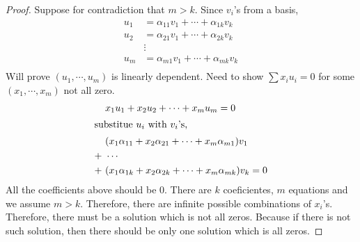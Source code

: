 \begin{proof}
	Suppose for contradiction that $m > k$. Since $v_i$'s from a basis,
	\begin{align*}
		u_1 &= \alpha_{11} v_1 + \cdots + \alpha_{1k}v_k\\
		u_2 &= \alpha_{21} v_1 + \cdots + \alpha_{2k}v_k\\
            &\vdots\\
        u_m &= \alpha_{m1} v_1 + \cdots + \alpha_{mk}v_k\\
	\end{align*}
Will prove $(u_1, \cdots, u_m)$ is linearly dependent. Need to show
$\sum x_i u_i = 0$ for some $(x_1, \cdots, x_m)$ not all zero.
\begin{align*}
	&x_1 u_1 + x_2 u_2 + \cdots + x_m u_m = 0\\
	\intertext{substitue $u_i$ with $v_i$'s,}
	&(x_1 \alpha_{11} + x_2 \alpha_{21} + \cdots + x_m \alpha_{m1}) v_1\\
	+~& \cdots\\
	+~&(x_1 \alpha_{1k} + x_2 \alpha_{2k} + \cdots + x_m \alpha_{mk}) v_k = 0
\end{align*}
All the coefficients above should be 0. There are $k$ coeficientes, $m$ 
equations and we assume $m > k$. Therefore, there are infinite possible 
combinations of $x_i$'s. Therefore, there must be a solution which is not 
all zeros. Because if there is not such solution, then there should be only one 
solution which is all zeros.
\end{proof}



